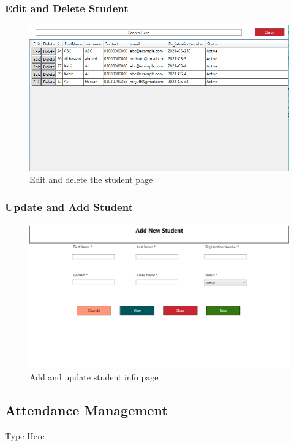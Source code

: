 \documentclass[12pt,a4paper]{article}
\begin{document}
\subsubsection{Edit and Delete Student}
\begin{figure}[H]
  \centering
    \includegraphics[scale=0.8]{GUIViewStudent}
    
  \caption{Edit and delete the student page}
\end{figure}
\subsubsection{Update and Add Student}
\begin{figure}[H]
  \centering
   \includegraphics[scale=0.6]{GUIAddStudent}
   
  \caption{Add and update student info page}
\end{figure}


\subsection{Attendance Management}
Type Here
\end{document}
